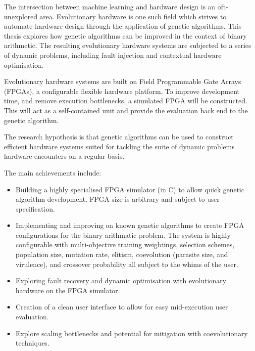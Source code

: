The intersection between machine learning and hardware design is an oft-unexplored
area. Evolutionary hardware is one such field which strives
to automate hardware design through the application of genetic algorithms.
This thesis
explores how genetic algorithms can be improved in the context
of binary arithmetic.
The resulting evolutionary hardware systems are subjected to a series of
dynamic problems, including fault injection and contextual hardware optimisation.

Evolutionary hardware systems are built on Field Programmable Gate Arrays (FPGAs),
a configurable flexible hardware platform.
To improve development
time, and remove execution bottlenecks, a simulated FPGA will be constructed.
This will act as a self-contained unit and provide the evaluation back end to the genetic algorithm.

The research hypothesis is that genetic algorithms can be used to construct
efficient hardware systems suited for tackling the suite of dynamic problems
hardware encounters on a regular basis.

The main achievements include:
\begin{itemize}
	\item Building a highly specialised FPGA simulator (in C) to allow quick
		genetic algorithm development. FPGA size is arbitrary and subject to
		user specification.
	\item Implementing and improving on known genetic algorithms to
		create FPGA configurations for the binary arithmatic problem. The system is
		highly configurable with multi-objective training weightings, selection schemes,
		population size, mutation rate, elitism, coevolution (parasite size, and virulence),
		and crossover probability all subject to the whims of the user.
	\item Exploring fault recovery and dynamic optimisation with evolutionary
		hardware on the FPGA simulator.
	\item Creation of a clean user interface to allow for easy mid-execution user
		evaluation.
	\item Explore scaling bottlenecks and potential for mitigation with coevolutionary
		techniques.
\end{itemize}
